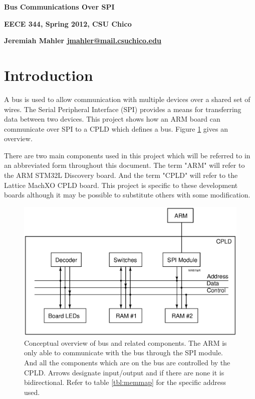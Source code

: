 \documentclass{article}
\begin{document}

\centerline{\Large \textbf{Bus Communications Over SPI}}
\vspace{2em}
\centerline{\small \textbf{EECE 344, Spring 2012, CSU Chico}}
\vspace{0.5em}
\centerline{\small \textbf{Jeremiah Mahler \href{mailto:jmahler@mail.csuchico.edu}{jmahler@mail.csuchico.edu}}}
\vspace{2em}



\section{Introduction}

A bus is used to allow communication with multiple devices
over a shared set of wires.
The Serial Peripheral Interface (SPI) provides a means
for transferring data between two devices.
This project shows how an ARM board can communicate over
SPI to a CPLD which defines a bus.
Figure \ref{fig:bus} gives an overview.

There are two main components used in this project which
will be referred to in an abbreviated form throughout this document.
The term "ARM" will refer to the ARM STM32L Discovery\cite{UM1079} board.
And the term "CPLD" will refer to the Lattice MachXO\cite{EB66}
CPLD board.
This project is specific to these development boards although it
may be possible to substitute others with some modification.

\begin{figure}[hbp]
\center
\includegraphics[scale=0.7]{figures/schematics/BUS}
\caption{Conceptual overview of bus and related components.
The ARM is only able to communicate with the bus through the SPI
module.
And all the components which are on the bus are controlled by the
CPLD.
Arrows designate input/output and if there are none it is bidirectional.
Refer to table \ref{tbl:memmap} for the specific address used.
}
\label{fig:bus}
\end{figure}
\end{document}
